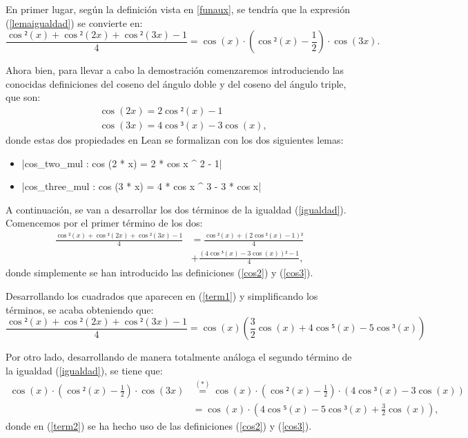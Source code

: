 \begin{demostracion}
  En primer lugar, según la definición vista en \ref{funaux}, se
  tendría que la expresión (\ref{lemaigualdad}) se convierte en:
  \begin{equation}\label{igualdad}
    \frac{\cos²(x)+\cos²(2x)+\cos²(3x)-1}{4}=
    \cos(x)·(\cos²(x)-\frac{1}{2})·\cos(3x).
  \end{equation}
  
  Ahora bien, para llevar a cabo la demostración comenzaremos
  introduciendo las conocidas definiciones del coseno del
  ángulo doble y del coseno del ángulo triple, que son:
  \begin{align}
    & \cos(2x)=2\cos²(x)-1\label{cos2}\\
    & \cos(3x)=4\cos³(x)-3\cos(x)\label{cos3},
  \end{align}
  donde estas dos propiedades en Lean se formalizan con los
  dos siguientes lemas:
  \begin{itemize}
\item {}|cos_two_mul : cos (2 * x) = 2 * cos x ^ 2 - 1|
\item {}|cos_three_mul : cos (3 * x) = 4 * cos x ^ 3 - 3 * cos x|
\end{itemize}

A continuación, se van a desarrollar los dos términos de la
igualdad (\ref{igualdad}). Comencemos por el primer término
de los dos:
\begin{align}\label{term1}
  \frac{\cos²(x)+\cos²(2x)+\cos²(3x)-1}{4}&=\frac{\cos²(x)+(2\cos²(x)-1)²}{4}\\
  &+\frac{(4\cos³(x)-3\cos(x))²-1}{4},
\end{align}
donde simplemente se han introducido las definiciones (\ref{cos2})
y (\ref{cos3}).

Desarrollando los cuadrados que aparecen en (\ref{term1}) y
simplificando los términos, se acaba obteniendo que:
\begin{equation}\label{term11}
  \frac{\cos²(x)+\cos²(2x)+\cos²(3x)-1}{4}=
  \cos(x)(\frac{3}{2}\cos(x)+4\cos⁵(x)-5\cos³(x))
\end{equation}

Por otro lado, desarrollando de manera totalmente análoga el
segundo término de la igualdad (\ref{igualdad}), se tiene que:
\begin{align}
  \cos(x)·(\cos²(x)-\frac{1}{2})·\cos(3x)&\stackrel{(*)}{=}\cos(x)·
                                           (\cos²(x)-\frac{1}{2})·
                                           (4\cos³(x)-3\cos(x)
                                           )\label{term2}\\
                                         &=\cos(x)·
                                           (4\cos⁵(x)-5\cos³(x)
                                           +\frac{3}{2}\cos(x))
                                           \label{term21},
\end{align}
donde en (\ref{term2}) se ha hecho uso de las definiciones (\ref{cos2})
y (\ref{cos3}).


\end{demostracion}
